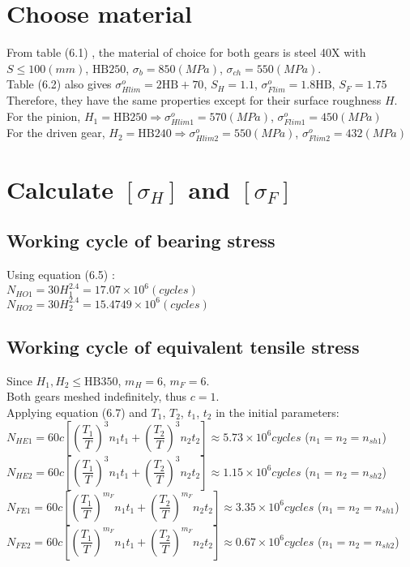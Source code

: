 \section{Choose material}
From table (6.1) , the material of choice for both gears is steel 40X with $ S\leq100\unit{(mm)} $, $ \text{HB} 250 $, $ \sigma_b = 850\unit{(MPa)} $, $ \sigma_{ch} = 550 \unit{(MPa)}$.\\
Table (6.2)  also gives $ \sigma_{Hlim}^o = 2\text{HB} + 70$, $ S_H = 1.1 $, $ \sigma_{Flim}^o = 1.8\text{HB} $, $ S_F = 1.75 $\\
Therefore, they have the same properties except for their surface roughness $ H $.\\
For the pinion, $ H_1=\text{HB}250 \Rightarrow \sigma_{Hlim1}^o = 570\unit{(MPa)}$, $ \sigma_{Flim1}^o = 450\unit{(MPa)}$\\
For the driven gear, $ H_2=\text{HB}240 \Rightarrow \sigma_{Hlim2}^o = 550\unit{(MPa)}$, $ \sigma_{Flim2}^o = 432\unit{(MPa)}$

\section{Calculate $ [\sigma_H] $ and $ [\sigma_F] $}

\subsection{Working cycle of bearing stress}
Using equation (6.5) :\\
$ N_{HO1} = 30H_1^{2.4} = 17.07\times10^6\unit{(cycles)}$\\
$ N_{HO2} = 30H_2^{2.4} = 15.4749\times10^6\unit{(cycles)}$

\subsection{Working cycle of equivalent tensile stress}
Since $ H_1,H_2\leq\text{HB}350 $, $ m_H=6 $, $ m_F=6 $.\\
Both gears meshed indefinitely, thus $ c=1 $.\\ Applying equation (6.7)  and $ T_1 $, $ T_2 $, $ t_1 $, $ t_2 $ in the initial parameters:\\
$ N_{HE1} = 60c\left[ \left( \dfrac{T_1}{T}\right)^3n_1t_1 + \left( \dfrac{T_2}{T}\right)^3n_2t_2\right] \approx 5.73\times10^6\unit{cycles}$ ($ n_1=n_2=n_{sh1} $)\\
$ N_{HE2} = 60c\left[ \left( \dfrac{T_1}{T}\right)^3n_1t_1 + \left( \dfrac{T_2}{T}\right)^3n_2t_2\right] \approx 1.15\times10^6\unit{cycles}$ ($ n_1=n_2=n_{sh2} $)\\
$ N_{FE1} = 60c\left[ \left( \dfrac{T_1}{T}\right)^{m_F}n_1t_1 + \left( \dfrac{T_2}{T}\right)^{m_F}n_2t_2\right] \approx 3.35\times10^6\unit{cycles}$ ($ n_1=n_2=n_{sh1} $)\\
$ N_{FE2} = 60c\left[ \left( \dfrac{T_1}{T}\right)^{m_F}n_1t_1 + \left( \dfrac{T_2}{T}\right)^{m_F}n_2t_2\right] \approx 0.67\times10^6\unit{cycles}$ ($ n_1=n_2=n_{sh2} $)

